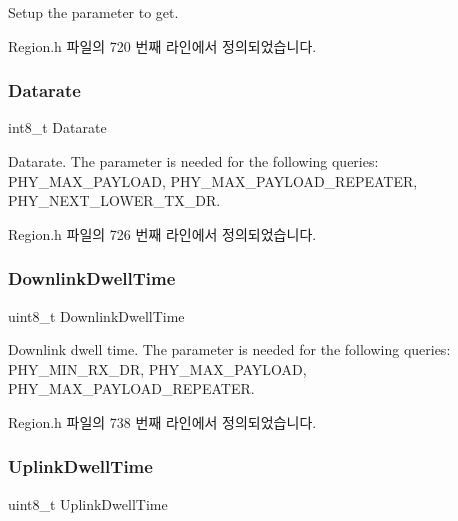 Setup the parameter to get. 

Region.\+h 파일의 720 번째 라인에서 정의되었습니다.

\mbox{\label{structs_get_phy_params_ae2f6080f3aa0e9485c55513ca56bb24d}} 
\subsubsection{\texorpdfstring{Datarate}{Datarate}}
{\footnotesize\ttfamily int8\+\_\+t Datarate}

Datarate. The parameter is needed for the following queries\+: P\+H\+Y\+\_\+\+M\+A\+X\+\_\+\+P\+A\+Y\+L\+O\+AD, P\+H\+Y\+\_\+\+M\+A\+X\+\_\+\+P\+A\+Y\+L\+O\+A\+D\+\_\+\+R\+E\+P\+E\+A\+T\+ER, P\+H\+Y\+\_\+\+N\+E\+X\+T\+\_\+\+L\+O\+W\+E\+R\+\_\+\+T\+X\+\_\+\+DR. 

Region.\+h 파일의 726 번째 라인에서 정의되었습니다.

\mbox{\label{structs_get_phy_params_a63074ce7d23ff98956f5d6f4054f235f}} 
\subsubsection{\texorpdfstring{Downlink\+Dwell\+Time}{DownlinkDwellTime}}
{\footnotesize\ttfamily uint8\+\_\+t Downlink\+Dwell\+Time}

Downlink dwell time. The parameter is needed for the following queries\+: P\+H\+Y\+\_\+\+M\+I\+N\+\_\+\+R\+X\+\_\+\+DR, P\+H\+Y\+\_\+\+M\+A\+X\+\_\+\+P\+A\+Y\+L\+O\+AD, P\+H\+Y\+\_\+\+M\+A\+X\+\_\+\+P\+A\+Y\+L\+O\+A\+D\+\_\+\+R\+E\+P\+E\+A\+T\+ER. 

Region.\+h 파일의 738 번째 라인에서 정의되었습니다.

\mbox{\label{structs_get_phy_params_a0e6663762d6f9173bc8d8cb018f8f17a}} 
\subsubsection{\texorpdfstring{Uplink\+Dwell\+Time}{UplinkDwellTime}}
{\footnotesize\ttfamily uint8\+\_\+t Uplink\+Dwell\+Time}


